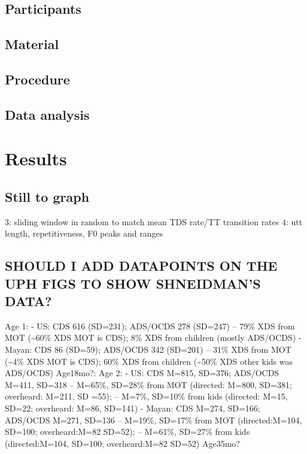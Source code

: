 \documentclass[man]{apa6}
\theoremstyle{definition}
\theoremstyle{definition}
\theoremstyle{definition}
\theoremstyle{remark}
\begin{document}
\subsection{Participants}\label{participants}

\subsection{Material}\label{material}

\subsection{Procedure}\label{procedure}

\subsection{Data analysis}\label{data-analysis}

\section{Results}\label{results}

\subsection{Still to graph}\label{still-to-graph}

3: sliding window in random to match mean TDS rate/TT transition rates
4: utt length, repetitiveness, F0 peaks and ranges

\subsection{SHOULD I ADD DATAPOINTS ON THE UPH FIGS TO SHOW SHNEIDMAN'S
DATA?}\label{should-i-add-datapoints-on-the-uph-figs-to-show-shneidmans-data}

Age 1: - US: CDS 616 (SD=231); ADS/OCDS 278 (SD=247) -- 79\% XDS from
MOT (\textasciitilde{}60\% XDS MOT is CDS); 8\% XDS from children
(mostly ADS/OCDS) - Mayan: CDS 86 (SD=59); ADS/OCDS 342 (SD=201) -- 31\%
XDS from MOT (\textasciitilde{}4\% XDS MOT is CDS); 60\% XDS from
children (\textasciitilde{}50\% XDS other kids was ADS/OCDS) Age18mo?:
Age 2: - US: CDS M=815, SD=376; ADS/OCDS M=411, SD=318 -- M=65\%,
SD=28\% from MOT (directed: M=800, SD=381; overheard: M=211, SD =55); --
M=7\%, SD=10\% from kids (directed: M=15, SD=22; overheard: M=86,
SD=141) - Mayan: CDS M=274, SD=166; ADS/OCDS M=271, SD=136 -- M=19\%,
SD=17\% from MOT (directed:M=104, SD=100; overheard:M=82 SD=52); --
M=61\%, SD=27\% from kids (directed:M=104, SD=100; overheard:M=82 SD=52)
Age35mo?
\end{document}
